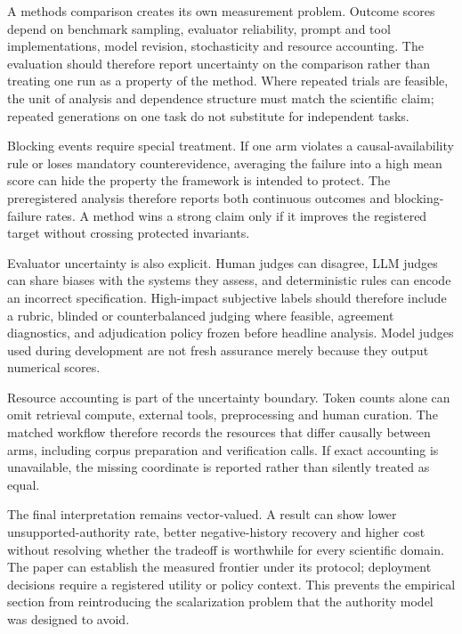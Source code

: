 A methods comparison creates its own measurement problem. Outcome scores depend on benchmark sampling, evaluator reliability, prompt and tool implementations, model revision, stochasticity and resource accounting. The evaluation should therefore report uncertainty on the comparison rather than treating one run as a property of the method. Where repeated trials are feasible, the unit of analysis and dependence structure must match the scientific claim; repeated generations on one task do not substitute for independent tasks.

Blocking events require special treatment. If one arm violates a causal-availability rule or loses mandatory counterevidence, averaging the failure into a high mean score can hide the property the framework is intended to protect. The preregistered analysis therefore reports both continuous outcomes and blocking-failure rates. A method wins a strong claim only if it improves the registered target without crossing protected invariants.

Evaluator uncertainty is also explicit. Human judges can disagree, LLM judges can share biases with the systems they assess, and deterministic rules can encode an incorrect specification. High-impact subjective labels should therefore include a rubric, blinded or counterbalanced judging where feasible, agreement diagnostics, and adjudication policy frozen before headline analysis. Model judges used during development are not fresh assurance merely because they output numerical scores.

Resource accounting is part of the uncertainty boundary. Token counts alone can omit retrieval compute, external tools, preprocessing and human curation. The matched workflow therefore records the resources that differ causally between arms, including corpus preparation and verification calls. If exact accounting is unavailable, the missing coordinate is reported rather than silently treated as equal.

The final interpretation remains vector-valued. A result can show lower unsupported-authority rate, better negative-history recovery and higher cost without resolving whether the tradeoff is worthwhile for every scientific domain. The paper can establish the measured frontier under its protocol; deployment decisions require a registered utility or policy context. This prevents the empirical section from reintroducing the scalarization problem that the authority model was designed to avoid.

